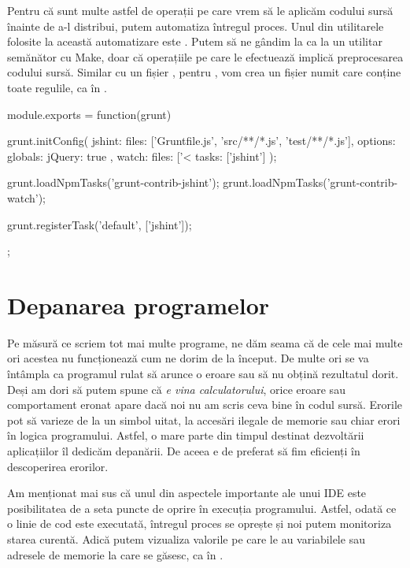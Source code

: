 Pentru că sunt multe astfel de operații pe care vrem să le aplicăm codului sursă înainte de a-l distribui, putem automatiza întregul proces.
Unul din utilitarele folosite la această automatizare este .
Putem să ne gândim la  ca la un utilitar semănător cu Make, doar că operațiile pe care  le efectuează implică preprocesarea codului sursă.
Similar cu un fișier , pentru , vom crea un fișier numit  care conține toate regulile, ca în .

\begin{screen}[caption={Exemplu cod Gruntfile},label={lst:appdev:gruntfile}]
module.exports = function(grunt) {

 grunt.initConfig({
   jshint: {
     files: ['Gruntfile.js', 'src/**/*.js', 'test/**/*.js'],
     options: {
       globals: {
         jQuery: true
       }
     }
   },
   watch: {
     files: ['<%
     tasks: ['jshint']
   }
 });

 grunt.loadNpmTasks('grunt-contrib-jshint');
 grunt.loadNpmTasks('grunt-contrib-watch');

 grunt.registerTask('default', ['jshint']);

};
\end{screen}

\section{Depanarea programelor}
\label{sec:appdev:debug}

Pe măsură ce scriem tot mai multe programe, ne dăm seama că de cele mai multe ori acestea nu funcționează cum ne dorim de la început.
De multe ori se va întâmpla ca programul rulat să arunce o eroare sau să nu obțină rezultatul dorit.
Deși am dori să putem spune că \textit{e vina calculatorului}, orice eroare sau comportament eronat apare dacă noi nu am scris ceva bine în codul sursă.
Erorile pot să varieze de la un simbol uitat, la accesări ilegale de memorie sau chiar erori în logica programului.
Astfel, o mare parte din timpul destinat dezvoltării aplicațiilor îl dedicăm depanării.
De aceea e de preferat să fim eficienți în descoperirea erorilor.

Am menționat mai sus că unul din aspectele importante ale unui IDE este posibilitatea de a seta puncte de oprire în execuția programului.
Astfel, odată ce o linie de cod este executată, întregul proces se oprește și noi putem monitoriza starea curentă.
Adică putem vizualiza valorile pe care le au variabilele sau adresele de memorie la care se găsesc, ca în .

